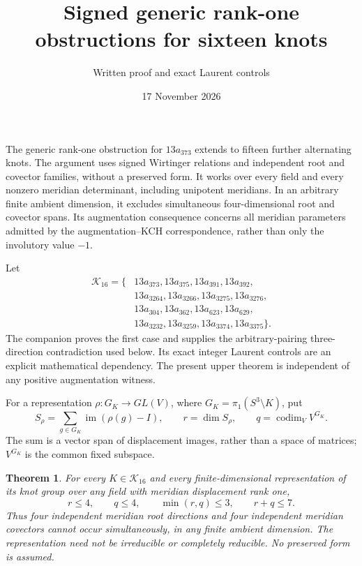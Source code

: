 \documentclass[11pt]{article}
\title{Signed generic rank-one obstructions for sixteen knots}
\author{Written proof and exact Laurent controls}
\date{17 November 2026}
\newtheorem{theorem}{Theorem}
\begin{document}
\maketitle

The generic rank-one obstruction for $13a_{373}$ extends to fifteen
further alternating knots. The argument uses signed Wirtinger
relations and independent root and covector families, without a
preserved form. It works over every field and every nonzero meridian
determinant, including unipotent meridians. In an arbitrary finite
ambient dimension, it excludes simultaneous four-dimensional root
and covector spans. Its augmentation consequence
concerns all meridian parameters admitted by the augmentation--KCH
correspondence, rather than only the involutory value $-1$.

Let
\[
\begin{aligned}
\mathcal K_{16}=\{&13a_{373},13a_{375},13a_{391},13a_{392},\\
&13a_{3264},13a_{3266},13a_{3275},13a_{3276},\\
&13a_{304},13a_{362},13a_{623},13a_{629},\\
&13a_{3232},13a_{3259},13a_{3374},13a_{3375}\}.
\end{aligned}
\]
The companion  proves the first
case and supplies the arbitrary-pairing three-direction contradiction
used below. Its exact integer Laurent controls are an explicit
mathematical dependency. The present upper theorem is independent of
any positive augmentation witness.

For a representation $\rho:G_K\to GL(V)$, where
$G_K=\pi_1(S^3\setminus K)$, put
\[
 S_\rho=\sum_{g\in G_K}\operatorname{im}(\rho(g)-I),\qquad
 r=\dim S_\rho,\qquad q=\operatorname{codim}_V V^{G_K}.
\]
The sum is a vector span of displacement images, rather than a space
of matrices; $V^{G_K}$ is the common fixed subspace.

\begin{theorem}\label{thm:pairedspans}
For every $K\in\mathcal K_{16}$ and every finite-dimensional
representation of its knot group over any field with meridian
displacement rank one,
\[
 r\le4,\qquad q\le4,\qquad \min(r,q)\le3,
 \qquad r+q\le7.
\]
Thus four independent meridian root directions and four independent
meridian covectors cannot occur simultaneously, in any finite ambient
dimension. The representation need not be irreducible or completely
reducible. No preserved form is assumed.
\end{theorem}
\end{document}
